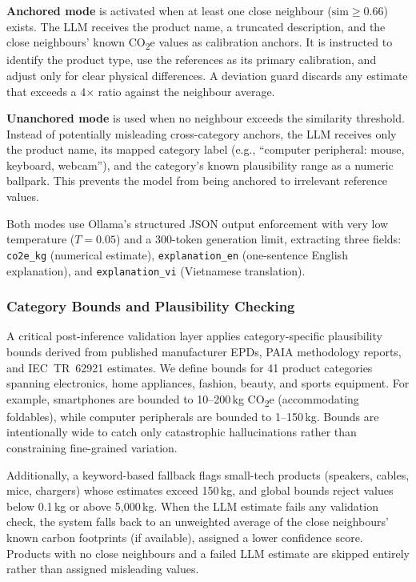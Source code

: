 \documentclass[conference]{IEEEtran}
\begin{document}
\textbf{Anchored mode} is activated when at least one close neighbour ($\text{sim} \geq 0.66$) exists. The LLM receives the product name, a truncated description, and the close neighbours' known CO\textsubscript{2}e values as calibration anchors. It is instructed to identify the product type, use the references as its primary calibration, and adjust only for clear physical differences. A deviation guard discards any estimate that exceeds a 4$\times$ ratio against the neighbour average.

\textbf{Unanchored mode} is used when no neighbour exceeds the similarity threshold. Instead of potentially misleading cross-category anchors, the LLM receives only the product name, its mapped category label (e.g., ``computer peripheral: mouse, keyboard, webcam''), and the category's known plausibility range as a numeric ballpark. This prevents the model from being anchored to irrelevant reference values.

Both modes use Ollama's structured JSON output enforcement with very low temperature ($T = 0.05$) and a 300-token generation limit, extracting three fields: \texttt{co2e\_kg} (numerical estimate), \texttt{explanation\_en} (one-sentence English explanation), and \texttt{explanation\_vi} (Vietnamese translation).

\subsubsection{Category Bounds and Plausibility Checking}

A critical post-inference validation layer applies category-specific plausibility bounds derived from published manufacturer EPDs, PAIA methodology reports, and IEC~TR~62921 estimates. We define bounds for 41 product categories spanning electronics, home appliances, fashion, beauty, and sports equipment. For example, smartphones are bounded to 10--200\,kg CO\textsubscript{2}e (accommodating foldables), while computer peripherals are bounded to 1--150\,kg. Bounds are intentionally wide to catch only catastrophic hallucinations rather than constraining fine-grained variation.

Additionally, a keyword-based fallback flags small-tech products (speakers, cables, mice, chargers) whose estimates exceed 150\,kg, and global bounds reject values below 0.1\,kg or above 5{,}000\,kg. When the LLM estimate fails any validation check, the system falls back to an unweighted average of the close neighbours' known carbon footprints (if available), assigned a lower confidence score. Products with no close neighbours and a failed LLM estimate are skipped entirely rather than assigned misleading values.
\end{document}

